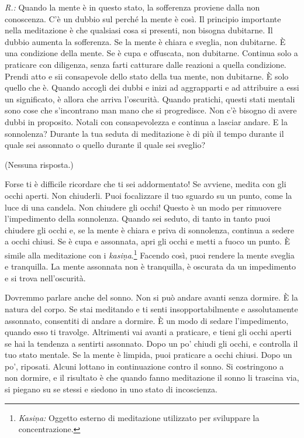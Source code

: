 \emph{R.:} Quando la mente è in questo stato, la sofferenza proviene dalla non
conoscenza. C'è un dubbio sul perché la mente è così. Il principio
importante nella meditazione è che qualsiasi cosa si presenti, non
bisogna dubitarne. Il dubbio aumenta la sofferenza. Se la mente è chiara
e sveglia, non dubitarne. È una condizione della mente. Se è cupa e
offuscata, non dubitarne. Continua solo a praticare con diligenza, senza
farti catturare dalle reazioni a quella condizione. Prendi atto e sii
consapevole dello stato della tua mente, non dubitarne. È solo quello
che è. Quando accogli dei dubbi e inizi ad aggrapparti e ad attribuire a
essi un significato, è allora che arriva l'oscurità. Quando pratichi,
questi stati mentali sono cose che s'incontrano man mano che si
progredisce. Non c'è bisogno di avere dubbi in proposito. Notali con
consapevolezza e continua a lasciar andare. E la sonnolenza? Durante la
tua seduta di meditazione è di più il tempo durante il quale sei
assonnato o quello durante il quale sei sveglio?

(Nessuna risposta.)

Forse ti è difficile ricordare che ti sei addormentato! Se avviene,
medita con gli occhi aperti. Non chiuderli. Puoi focalizzare il tuo
sguardo su un punto, come la luce di una candela. Non chiudere gli
occhi! Questo è un modo per rimuovere l'impedimento della sonnolenza.
Quando sei seduto, di tanto in tanto puoi chiudere gli occhi e, se la
mente è chiara e priva di sonnolenza, continua a sedere a occhi chiusi.
Se è cupa e assonnata, apri gli occhi e metti a fuoco un punto. È simile
alla meditazione con i \emph{kasiṇa}.\footnote{\emph{Kasiṇa:} Oggetto
  esterno di meditazione utilizzato per sviluppare la concentrazione.}
Facendo così, puoi rendere la mente sveglia e tranquilla. La mente
assonnata non è tranquilla, è oscurata da un impedimento e si trova
nell'oscurità.

Dovremmo parlare anche del sonno. Non si può andare avanti senza
dormire. È la natura del corpo. Se stai meditando e ti senti
insopportabilmente e assolutamente assonnato, consentiti di andare a
dormire. È un modo di sedare l'impedimento, quando esso ti travolge.
Altrimenti vai avanti a praticare, e tieni gli occhi aperti se hai la
tendenza a sentirti assonnato. Dopo un po' chiudi gli occhi, e controlla
il tuo stato mentale. Se la mente è limpida, puoi praticare a occhi
chiusi. Dopo un po', riposati. Alcuni lottano in continuazione contro il
sonno. Si costringono a non dormire, e il risultato è che quando fanno
meditazione il sonno li trascina via, si piegano su se stessi e siedono
in uno stato di incoscienza.

